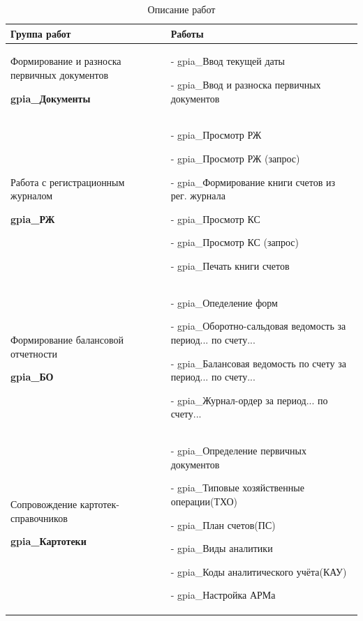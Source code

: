 \begin{table}[h!p]
    \centering
    \scriptsize
    \caption{Описание работ}
    \begin{tabular}{|p{8cm}|p{9cm}|} 


\hline


\textbf{Группа работ}
&
\textbf{Работы}
\\ \hline


Формирование и разноска первичных документов \par
\hspace{0pt} \par
\textbf{gpia\_Документы}
&
- gpia\_Ввод текущей даты \par
- gpia\_Ввод и разноска первичных документов
\\ \hline


Работа с регистрационным журналом \par
\hspace{0pt} \par
\textbf{gpia\_РЖ}
&
- gpia\_Просмотр РЖ \par
- gpia\_Просмотр РЖ (запрос) \par
- gpia\_Формирование книги счетов из рег. журнала \par
- gpia\_Просмотр КС \par
- gpia\_Просмотр КС (запрос) \par
- gpia\_Печать книги счетов
\\ \hline


Формирование балансовой отчетности \par
\hspace{0pt} \par
\textbf{gpia\_БО}
&
- gpia\_Опеделение форм \par
- gpia\_Оборотно-сальдовая ведомость за период... по счету... \par
- gpia\_Балансовая ведомость по счету за период... по счету... \par
- gpia\_Журнал-ордер за период... по счету...
\\ \hline


Сопровождение картотек-справочников \par
\hspace{0pt} \par
\textbf{gpia\_Картотеки}
&
- gpia\_Определение первичных документов \par
- gpia\_Типовые хозяйственные операции(ТХО) \par
- gpia\_План счетов(ПС) \par
- gpia\_Виды аналитики \par
- gpia\_Коды аналитического учёта(КАУ) \par
- gpia\_Настройка АРМа
\\ \hline


\end{tabular}
\end{table}
